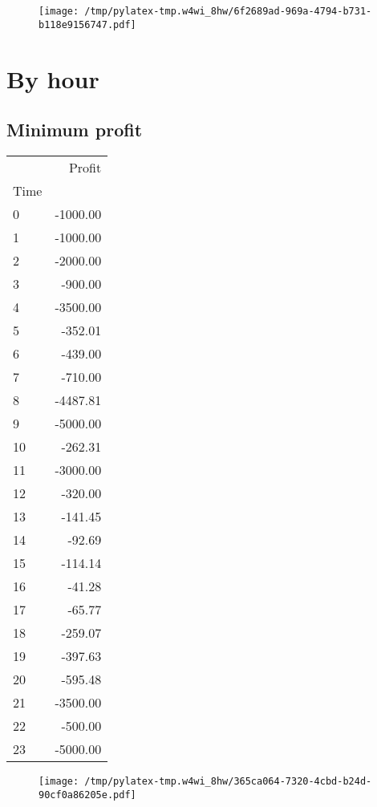 \documentclass{article}%
\begin{document}
\begin{figure}[htbp]%
\centering%
\texttt{[image: /tmp/pylatex-tmp.w4wi\_8hw/6f2689ad-969a-4794-b731-b118e9156747.pdf]}%
\end{figure}

%
\newpage %
\section{By hour}%
\label{sec:Byhour}%
\subsection{Minimum profit }%
\label{subsec:Minimumprofit}%
\begin{tabular}{lr}
\toprule
{} &   Profit \\
Time &          \\
\midrule
0    & -1000.00 \\
1    & -1000.00 \\
2    & -2000.00 \\
3    &  -900.00 \\
4    & -3500.00 \\
5    &  -352.01 \\
6    &  -439.00 \\
7    &  -710.00 \\
8    & -4487.81 \\
9    & -5000.00 \\
10   &  -262.31 \\
11   & -3000.00 \\
12   &  -320.00 \\
13   &  -141.45 \\
14   &   -92.69 \\
15   &  -114.14 \\
16   &   -41.28 \\
17   &   -65.77 \\
18   &  -259.07 \\
19   &  -397.63 \\
20   &  -595.48 \\
21   & -3500.00 \\
22   &  -500.00 \\
23   & -5000.00 \\
\bottomrule
\end{tabular}
%


\begin{figure}[htbp]%
\centering%
\texttt{[image: /tmp/pylatex-tmp.w4wi\_8hw/365ca064-7320-4cbd-b24d-90cf0a86205e.pdf]}%
\end{figure}
\end{document}
